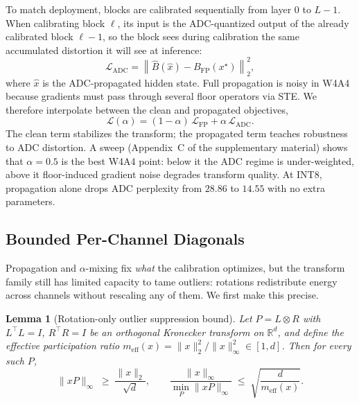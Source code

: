 \documentclass[letterpaper]{article} %
\theoremstyle{plain}
\newtheorem{lemma}{Lemma}
\begin{document}
To match deployment, blocks are calibrated sequentially from layer $0$ to $L-1$. When calibrating block $\ell$, its input is the ADC-quantized output of the already calibrated block $\ell-1$, so the block sees during calibration the same accumulated distortion it will see at inference:
\begin{equation}
    \mathcal{L}_{\mathrm{ADC}} = \left\| \hat{B}(\hat{x}) - B_{\mathrm{FP}}(x^{\star}) \right\|_2^2,
    \label{eq:ladc}
\end{equation}
where $\hat{x}$ is the ADC-propagated hidden state. Full propagation is noisy in W4A4 because gradients must pass through several floor operators via STE. We therefore interpolate between the clean and propagated objectives,
\begin{equation}
    \mathcal{L}(\alpha) = (1-\alpha)\,\mathcal{L}_{\mathrm{FP}} + \alpha\,\mathcal{L}_{\mathrm{ADC}}.
    \label{eq:alpha}
\end{equation}
The clean term stabilizes the transform; the propagated term teaches robustness to ADC distortion. A sweep (Appendix~C of the supplementary material) shows that $\alpha = 0.5$ is the best W4A4 point: below it the ADC regime is under-weighted, above it floor-induced gradient noise degrades transform quality. At INT8, propagation alone drops ADC perplexity from $28.86$ to $14.55$ with no extra parameters.

\subsection{Bounded Per-Channel Diagonals}

Propagation and $\alpha$-mixing fix \emph{what} the calibration optimizes, but the transform family still has limited capacity to tame outliers: rotations redistribute energy across channels without rescaling any of them. We first make this precise.

\begin{lemma}[Rotation-only outlier suppression bound]
\label{lem:rotation}
Let $P = L \otimes R$ with $L^\top L = I$, $R^\top R = I$ be an orthogonal Kronecker transform on $\mathbb{R}^d$, and define the effective participation ratio $m_{\mathrm{eff}}(x) = \|x\|_2^2 / \|x\|_\infty^2 \in [1, d]$. Then for every such $P$,
\begin{equation}
    \|xP\|_\infty \;\ge\; \frac{\|x\|_2}{\sqrt{d}},\qquad
    \frac{\|x\|_\infty}{\min_{P}\|xP\|_\infty} \;\le\; \sqrt{\frac{d}{m_{\mathrm{eff}}(x)}} .
\end{equation}
\end{lemma}
\end{document}
